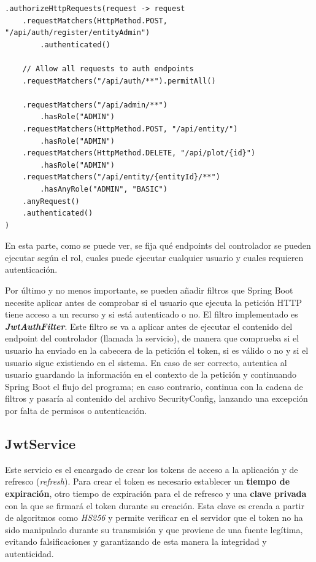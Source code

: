 \begin{verbatim}
.authorizeHttpRequests(request -> request
    .requestMatchers(HttpMethod.POST, "/api/auth/register/entityAdmin")
        .authenticated()

    // Allow all requests to auth endpoints
    .requestMatchers("/api/auth/**").permitAll()
    
    .requestMatchers("/api/admin/**")
        .hasRole("ADMIN")
    .requestMatchers(HttpMethod.POST, "/api/entity/")
        .hasRole("ADMIN")
    .requestMatchers(HttpMethod.DELETE, "/api/plot/{id}")
        .hasRole("ADMIN")
    .requestMatchers("/api/entity/{entityId}/**")
        .hasAnyRole("ADMIN", "BASIC")
    .anyRequest()
    .authenticated()
)
\end{verbatim}

En esta parte, como se puede ver, se fija qué endpoints del controlador se pueden ejecutar según el rol, cuales puede ejecutar cualquier usuario y cuales requieren autenticación.

Por último y no menos importante, se pueden añadir filtros que Spring Boot necesite aplicar antes de comprobar si el usuario que ejecuta la petición HTTP tiene acceso a un recurso y si está autenticado o no.
El filtro implementado es \textbf{\textit{JwtAuthFilter}}. Este filtro se va a aplicar antes de ejecutar el contenido del endpoint del controlador (llamada la servicio), de manera que comprueba si el usuario
ha enviado en la cabecera de la petición el token, si es válido o no y si el usuario sigue existiendo en el sistema. En caso de ser correcto, autentica al usuario guardando la información en el contexto de la
petición y continuando Spring Boot el flujo del programa; en caso contrario, continua con la cadena de filtros y pasaría al contenido del archivo SecurityConfig, lanzando una excepción por falta de permisos
o autenticación.

\subsection{JwtService}

Este servicio es el encargado de crear los tokens de acceso a la aplicación y de refresco (\textit{refresh}). Para crear el token es necesario establecer un \textbf{tiempo de expiración}, otro tiempo de expiración para 
el de refresco y una \textbf{clave privada} con la que se firmará el token durante su creación. Esta clave es creada a partir de algoritmos como \textit{HS256} y permite verificar en el servidor que el token no ha sido manipulado durante su transmisión y que proviene de una 
fuente legítima, evitando falsificaciones y garantizando de esta manera la integridad y autenticidad.

